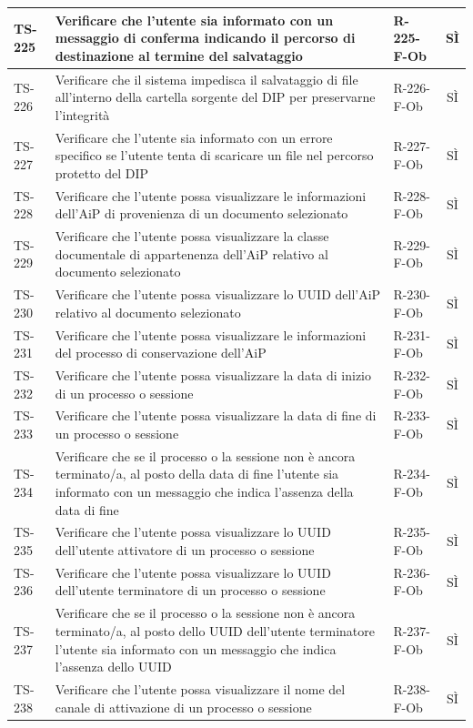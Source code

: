 \documentclass[a4paper,12pt]{article}
\begin{document}
\begin{longtable}{|p{1.5cm}|p{8.3cm}|p{2.4cm}|c|}
\hline
TS-225 & Verificare che l'utente sia informato con un messaggio di conferma indicando il percorso di destinazione al termine del salvataggio & R-225-F-Ob & SÌ \\
\hline
TS-226 & Verificare che il sistema impedisca il salvataggio di file all'interno della cartella sorgente del DIP per preservarne l'integrità & R-226-F-Ob & SÌ \\
\hline
TS-227 & Verificare che l'utente sia informato con un errore specifico se l'utente tenta di scaricare un file nel percorso protetto del DIP & R-227-F-Ob & SÌ \\
\hline
TS-228 & Verificare che l'utente possa visualizzare le informazioni dell'AiP di provenienza di un documento selezionato & R-228-F-Ob & SÌ \\
\hline
TS-229 & Verificare che l'utente possa visualizzare la classe documentale di appartenenza dell'AiP relativo al documento selezionato & R-229-F-Ob & SÌ \\
\hline
TS-230 & Verificare che l'utente possa visualizzare lo UUID dell'AiP relativo al documento selezionato & R-230-F-Ob & SÌ \\
\hline
TS-231 & Verificare che l'utente possa visualizzare le informazioni del processo di conservazione dell'AiP & R-231-F-Ob & SÌ \\
\hline
TS-232 & Verificare che l'utente possa visualizzare la data di inizio di un processo o sessione & R-232-F-Ob & SÌ \\
\hline
TS-233 & Verificare che l'utente possa visualizzare la data di fine di un processo o sessione & R-233-F-Ob & SÌ \\
\hline
TS-234 & Verificare che se il processo o la sessione non è ancora terminato/a, al posto della data di fine l'utente sia informato con un messaggio che indica l'assenza della data di fine & R-234-F-Ob & SÌ \\
\hline
TS-235 & Verificare che l'utente possa visualizzare lo UUID dell'utente attivatore di un processo o sessione & R-235-F-Ob & SÌ \\
\hline
TS-236 & Verificare che l'utente possa visualizzare lo UUID dell'utente terminatore di un processo o sessione & R-236-F-Ob & SÌ \\
\hline
TS-237 & Verificare che se il processo o la sessione non è ancora terminato/a, al posto dello UUID dell'utente terminatore l'utente sia informato con un messaggio che indica l'assenza dello UUID & R-237-F-Ob & SÌ \\
\hline
TS-238 & Verificare che l'utente possa visualizzare il nome del canale di attivazione di un processo o sessione & R-238-F-Ob & SÌ \\

\end{longtable}
\end{document}
